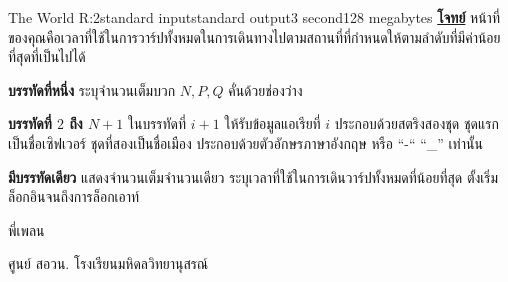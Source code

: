 \documentclass[11pt,a4paper]{article}
\begin{document}
\begin{problem}{The World R:2}{standard input}{standard output}{3 second}{128 megabytes}
\bigskip
\underline{\textbf{โจทย์}}  หน้าที่ของคุณคือเวลาที่ใช้ในการวาร์ปทั้งหมดในการเดินทางไปตามสถานที่ที่กำหนดให้ตามลำดับที่มีค่าน้อยที่สุดที่เป็นไปได้


\InputFile

\textbf{บรรทัดที่หนึ่ง} ระบุจำนวนเต็มบวก $N,P,Q$ คั่นด้วยช่องว่าง

\textbf{บรรทัดที่ $2$ ถึง $N+1$} ในบรรทัดที่ $i+1$ ให้รับข้อมูลแอเรียที่ $i$ ประกอบด้วยสตริงสองชุด ชุดแรกเป็นชื่อเซิฟเวอร์ ชุดที่สองเป็นชื่อเมือง ประกอบด้วยตัวอักษรภาษาอังกฤษ หรือ “-“  “\_”  เท่านั้น


\OutputFile

\textbf{มีบรรทัดเดียว}  แสดงจำนวนเต็มจำนวนเดียว ระบุเวลาที่ใช้ในการเดินวาร์ปทั้งหมดที่น้อยที่สุด ตั้งเริ่มล็อกอินจนถึงการล็อกเอาท์ 

\Examples

\begin{example}
%
\end{example}


\Source

พี่เพลน

ศูนย์ สอวน. โรงเรียนมหิดลวิทยานุสรณ์

\end{problem}
\end{document}
